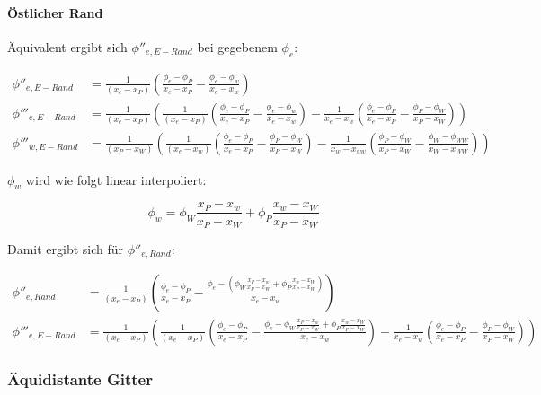 \documentclass[10pt, ngerman,colorback,accentcolor=tud2d]{tudreport}
\begin{document}
\paragraph{Östlicher Rand}
Äquivalent ergibt sich $\phi''_{e, E-Rand}$ bei gegebenem $\phi_e$:

\begin{align*}
  \phi''_{e, E-Rand} &= \frac{1}{(x_e-x_P)}\left({
\frac{\phi_{e}-\phi_P}{x_{e}-x_P}-\frac{\phi_e-\phi_w}{x_e-x_w}}\right)
\\
  \phi'''_{e, E-Rand} &= \frac{1}{(x_e-x_P)} \left({
  \frac{1}{(x_e-x_P)} \left({
    \frac{\phi_e-\phi_P}{x_e-x_P} - \frac{\phi_e-\phi_w}{x_e-x_w}
    }\right) -
  \frac{1}{x_e-x_w} \left({
    \frac{\phi_e-\phi_P}{x_e-x_P} - \frac{\phi_P-\phi_W}{x_P-x_W}
    }\right)
  }\right)
  \\
  \phi'''_{w, E-Rand} &= \frac{1}{(x_P-x_W)} \left({
  \frac{1}{(x_e-x_w)} \left({
      \frac{\phi_e-\phi_P}{x_e-x_P} - \frac{\phi_P-\phi_W}{x_P-x_W}
    }\right) -
    \frac{1}{x_w-x_{ww}} \left({
        \frac{\phi_P-\phi_W}{x_P-x_W} - \frac{\phi_W-\phi_{WW}}{x_W-x_{WW}}
    }\right)
  }\right)
\end{align*}

$\phi_w$ wird wie folgt linear interpoliert:

\begin{equation*}
  \phi_w = \phi_W \frac{x_P-x_w}{x_P-x_W} + \phi_P \frac{x_w-x_W}{x_P-x_W}
\end{equation*}

Damit ergibt sich für $\phi''_{e,Rand}$:

\begin{align}
  \phi''_{e,Rand} &= \frac{1}{(x_e-x_P)}\left({
\frac{\phi_{e}-\phi_P}{x_{e}-x_P}-\frac{\phi_e-
  \left({
   \phi_W \frac{x_P-x_w}{x_P-x_W} + \phi_P \frac{x_w-x_W}{x_P-x_W}
  }\right)
}{x_e-x_w}}\right)
\\
  \phi'''_{e, E-Rand} &= \frac{1}{(x_e-x_P)} \left({
  \frac{1}{(x_e-x_P)} \left({
    \frac{\phi_e-\phi_P}{x_e-x_P} - \frac{\phi_e- \phi_W \frac{x_P-x_w}{x_P-x_W} + \phi_P \frac{x_w-x_W}{x_P-x_W}
}{x_e-x_w}
    }\right) -
  \frac{1}{x_e-x_w} \left({
    \frac{\phi_e-\phi_P}{x_e-x_P} - \frac{\phi_P-\phi_W}{x_P-x_W}
    }\right)
  }\right)
\end{align}


\subsubsection{Äquidistante Gitter}
\end{document}
